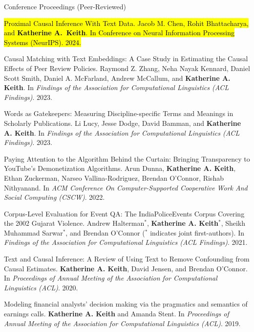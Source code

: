 \documentclass{resume} %
\begin{document}
\begin{rSection}{Conference Proceedings (Peer-Reviewed)}
\begin{etaremune}

\item \hl{Proximal Causal Inference With Text Data.
    Jacob M. Chen, Rohit Bhattacharya, and \textbf{Katherine A.~Keith}.
    In  Conference on Neural Information Processing Systems (NeurIPS). 2024.} 

\item Causal Matching with Text Embeddings: A Case Study in Estimating the Causal Effects of Peer Review Policies.
    Raymond Z. Zhang, Neha Nayak Kennard, 
    Daniel Scott Smith, Daniel A. McFarland, 
    Andrew McCallum, and \textbf{Katherine A. Keith}.
    In \emph{Findings of the Association for Computational Linguistics (ACL Findings)}. 2023.

\item Words as Gatekeepers: Measuring Discipline-specific
    Terms and Meanings in Scholarly Publications.
    Li Lucy, Jesse Dodge, David Bamman, and \textbf{Katherine A. Keith}.
    In \emph{Findings of the Association for Computational Linguistics (ACL Findings)}. 2023.

\item Paying Attention to the Algorithm Behind the Curtain: Bringing Transparency to YouTube's Demonetization Algorithms.
    Arun Dunna, \textbf{Katherine A. Keith}, Ethan Zuckerman, Narseo Vallina-Rodriguez, Brendan O'Connor, Rishab Nithyanand. 
    In \emph{ACM Conference On Computer-Supported Cooperative Work And Social Computing (CSCW)}. 2022. 

\item Corpus-Level Evaluation for Event QA: The IndiaPoliceEvents Corpus Covering the 2002 Gujarat Violence. Andrew Halterman$^*$, \textbf{Katherine A. Keith}$^*$, Sheikh Muhammad Sarwar$^*$, and Brendan O'Connor ($^*$ indicates joint first-authors).  In \emph{Findings of the Association for Computational Linguistics (ACL Findings)}. 2021.

\item Text and Causal Inference: A Review of Using Text to Remove Confounding from Causal Estimates. \textbf{Katherine A. Keith}, David Jensen, and Brendan O'Connor. In \emph{Proceedings of Annual Meeting of the Association for Computational Linguistics (ACL)}. 2020.  

\item Modeling financial analysts' decision making via the pragmatics and semantics of earnings calls. 
\textbf{Katherine A. Keith} and Amanda Stent. 
In \emph{Proceedings of Annual Meeting of the Association for Computational Linguistics (ACL)}.  2019. 


\end{etaremune}
\end{rSection}
\end{document}

